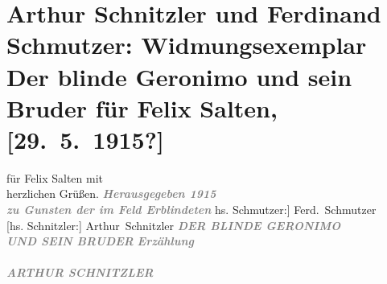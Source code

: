 

         
         \renewcommand{\erwaehntePersonen}{Personen: Felix Salten, Ferdinand Schmutzer}
         \renewcommand{\erwaehnteInstitutionen}{Institutionen: S. Fischer Verlag}
         \renewcommand{\erwaehnteOrte}{Orte: Berlin, Wien}
         \renewcommand{\erwaehnteWerke}{Werke: Der blinde Geronimo und sein Bruder}
               \section[Arthur Schnitzler und Ferdinand Schmutzer: Widmungsexemplar Der blinde Geronimo und sein Bruder für Felix Salten, {[}29. 5. 1915?{]}]{ Arthur Schnitzler und Ferdinand Schmutzer: Widmungsexemplar Der blinde
               Geronimo und sein Bruder für Felix Salten, {[}29. 5. 1915?{]}}\nopagebreak{}\rehead{ }\begin{ledgroupsized}[t]{13cm}\normalsize\beginnumbering{} \toendnotes[C]{\smallbreak\pagebreak[2]} 
\toendnotes[C]{\smallbreak}\pstart
           \noindent{}\centering{}{\pb}für Felix Salten\pend
           \pstart
           \noindent{}\centering{}mit {\\}herzlichen Grüßen.\pend
           {\bigskip}\pstart
           \noindent{}\centering{}\textcolor{gray}{\textbf{\emph{Herausgegeben 1915}}}{\\}\textcolor{gray}{\textbf{\emph{zu Gunsten der im Feld Erblindeten}}}\pend
           {\bigskip}\pstart
           \noindent{}\centering{}{[}hs. Schmutzer:{]} \spacefill\mbox{Ferd. Schmutzer}{\\}{[}hs. Schnitzler:{]} \spacefill\mbox{Arthur Schnitzler}\pend
           {\bigskip}\pstart
           \noindent{}\centering{}{\pb}\textcolor{gray}{\textbf{\emph{DER BLINDE GERONIMO {\\}UND SEIN
                           BRUDER}}}\pend
           \pstart
           \noindent{}\centering{}\textcolor{gray}{\textbf{\emph{Erzählung}}}{\\}\textcolor{gray}{\textbf{}}{\\}\textcolor{gray}{\textbf{\emph{ARTHUR SCHNITZLER}}}\pend

\end{ledgroupsized}
